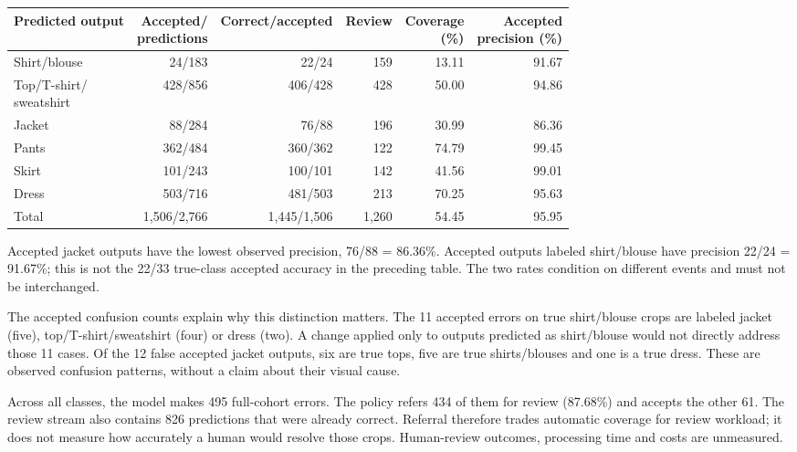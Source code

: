 \begin{center}\small
\setlength{\tabcolsep}{4pt}
\begin{tabular}{lrrrrr}\toprule
Predicted output & \shortstack{Accepted/\\predictions} & Correct/accepted & Review & \shortstack{Coverage\\(\%)} & \shortstack{Accepted\\precision (\%)}\\\midrule
Shirt/blouse & 24/183 & 22/24 & 159 & 13.11 & 91.67\\
\shortstack[l]{Top/T-shirt/\\sweatshirt} & 428/856 & 406/428 & 428 & 50.00 & 94.86\\
Jacket & 88/284 & 76/88 & 196 & 30.99 & 86.36\\
Pants & 362/484 & 360/362 & 122 & 74.79 & 99.45\\
Skirt & 101/243 & 100/101 & 142 & 41.56 & 99.01\\
Dress & 503/716 & 481/503 & 213 & 70.25 & 95.63\\\midrule
Total & 1,506/2,766 & 1,445/1,506 & 1,260 & 54.45 & 95.95\\\bottomrule
\end{tabular}\end{center}
Accepted jacket outputs have the lowest observed precision, 76/88 = 86.36\%. Accepted outputs labeled shirt/blouse have precision 22/24 = 91.67\%; this is not the 22/33 true-class accepted accuracy in the preceding table. The two rates condition on different events and must not be interchanged.

The accepted confusion counts explain why this distinction matters. The 11 accepted errors on true shirt/blouse crops are labeled jacket (five), top/T-shirt/sweatshirt (four) or dress (two). A change applied only to outputs predicted as shirt/blouse would not directly address those 11 cases. Of the 12 false accepted jacket outputs, six are true tops, five are true shirts/blouses and one is a true dress. These are observed confusion patterns, without a claim about their visual cause.

Across all classes, the model makes 495 full-cohort errors. The policy refers 434 of them for review (87.68\%) and accepts the other 61. The review stream also contains 826 predictions that were already correct. Referral therefore trades automatic coverage for review workload; it does not measure how accurately a human would resolve those crops. Human-review outcomes, processing time and costs are unmeasured.

